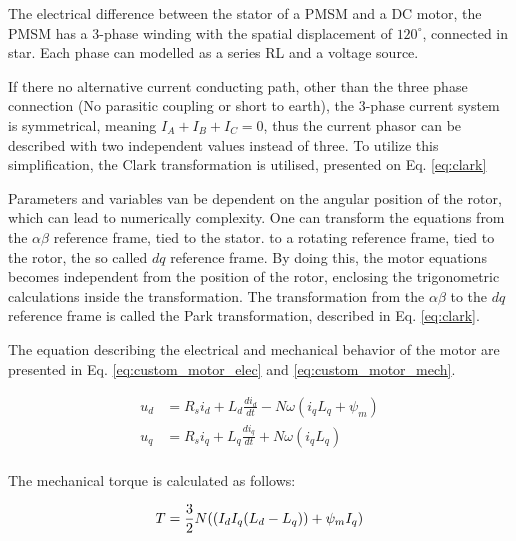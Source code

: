 \documentclass[twoside,b5paper,10pt]{article}
\begin{document}


The electrical difference between the stator of a PMSM and a DC motor, the PMSM has a 3-phase winding with the spatial displacement of $120^{\circ}$, connected in star. Each phase can modelled as a series RL and a voltage source. 



If there no alternative current conducting path, other than the three phase connection (No parasitic coupling or short to earth), the 3-phase current system is symmetrical, meaning $I_A + I_B + I_C = 0$, thus the current phasor can be described with two independent values instead of three. To utilize this simplification, the Clark transformation is utilised, presented on Eq. \ref{eq:clark}




Parameters and variables van be dependent on the angular position of the rotor, which can lead to numerically complexity. One can transform the equations from the $\alpha\beta$ reference frame, tied to the stator. to a rotating reference frame, tied to the rotor, the so called $dq$ reference frame. By doing this, the motor equations becomes independent from the position of the rotor, enclosing the trigonometric calculations inside the transformation. The transformation from the $\alpha{}\beta{}$ to the $dq$ reference frame is called the Park transformation, described in Eq. \ref{eq:clark}.





The equation describing the electrical and mechanical behavior of the motor are presented in Eq. \ref{eq:custom_motor_elec} and \ref{eq:custom_motor_mech}.

\begin{equation}
\begin{aligned}
\label{eq:custom_motor_elec}
    u_d &= R_si_d + L_d\frac{di_d}{dt}-N\omega{}(i_qL_q + \psi_m) \\
    u_q &= R_si_q + L_q\frac{di_q}{dt}+N\omega{}(i_qL_q) \\
\end{aligned}
\end{equation}

The mechanical torque is calculated as follows:

\begin{equation}
\label{eq:custom_motor_mech}
    T = \frac{3}{2}N((I_dI_q(L_d-L_q))+\psi_mI_q) \\
\end{equation}
\end{document}

